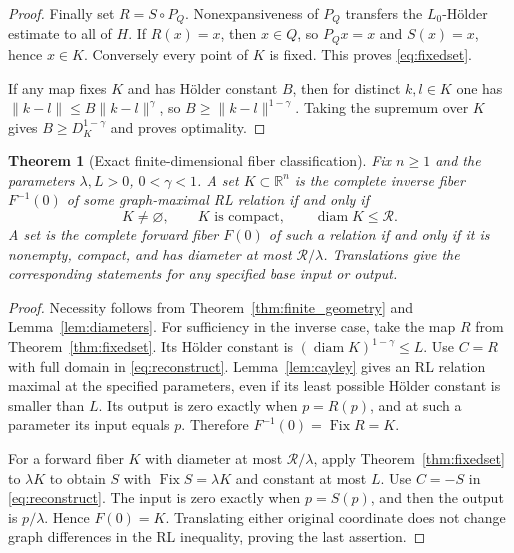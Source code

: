 \documentclass[11pt]{article}
\numberwithin{equation}{section}
\newtheorem{theorem}{Theorem}[section]
\theoremstyle{definition}
\theoremstyle{remark}
\newcommand{\R}{\mathbb R}
\newcommand{\diam}{\operatorname{diam}}
\newcommand{\Fix}{\operatorname{Fix}}
\newcommand{\rad}{\mathcal R}
\newcommand{\norm}[1]{\lVert #1\rVert}
\begin{document}
\begin{proof}
Finally set $R=S\circ P_Q$. Nonexpansiveness of $P_Q$ transfers the
$L_0$-H\"older estimate to all of $H$. If $R(x)=x$, then $x\in Q$,
so $P_Qx=x$ and $S(x)=x$, hence $x\in K$. Conversely every point of $K$
is fixed. This proves \eqref{eq:fixedset}.

If any map fixes $K$ and has H\"older constant $B$, then for distinct
$k,l\in K$ one has $\norm{k-l}\le B\norm{k-l}^\gamma$, so
$B\ge\norm{k-l}^{1-\gamma}$. Taking the supremum over $K$ gives
$B\ge D_K^{1-\gamma}$ and proves optimality.
\end{proof}

\begin{theorem}[Exact finite-dimensional fiber classification]\label{thm:fibers}
Fix $n\ge1$ and the parameters $\lambda,L>0$, $0<\gamma<1$.
A set $K\subset\R^n$ is the complete inverse fiber $F^{-1}(0)$ of
some graph-maximal RL relation if and only if
\begin{equation}\label{eq:fiberiff}
 K\ne\varnothing,\qquad K\text{ is compact},\qquad \diam K\le\rad.
\end{equation}
A set is the complete forward fiber $F(0)$ of such a relation if and
only if it is nonempty, compact, and has diameter at most
$\rad/\lambda$. Translations give the corresponding statements for
any specified base input or output.
\end{theorem}

\begin{proof}
Necessity follows from Theorem~\ref{thm:finite_geometry} and
Lemma~\ref{lem:diameters}. For sufficiency in the inverse case, take
the map $R$ from Theorem~\ref{thm:fixedset}. Its H\"older constant is
$(\diam K)^{1-\gamma}\le L$. Use $C=R$ with full domain in
\eqref{eq:reconstruct}. Lemma~\ref{lem:cayley} gives an RL relation
maximal at the specified parameters, even if its least possible
H\"older constant is smaller than $L$. Its output is zero exactly when
$p=R(p)$, and at such a parameter its input equals $p$. Therefore
$F^{-1}(0)=\Fix R=K$.

For a forward fiber $K$ with diameter at most $\rad/\lambda$, apply
Theorem~\ref{thm:fixedset} to $\lambda K$ to obtain $S$ with
$\Fix S=\lambda K$ and constant at most $L$. Use $C=-S$ in
\eqref{eq:reconstruct}. The input is zero exactly when $p=S(p)$,
and then the output is $p/\lambda$. Hence $F(0)=K$. Translating either
original coordinate does not change graph differences in the RL
inequality, proving the last assertion.
\end{proof}
\end{document}
